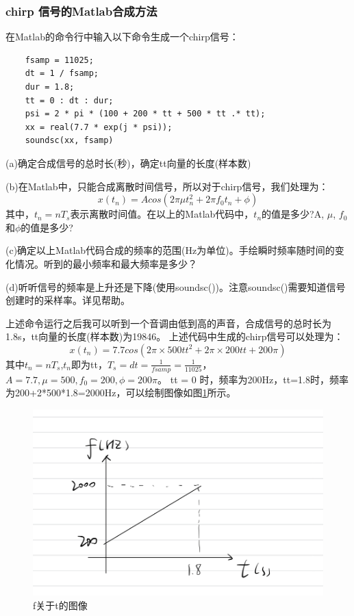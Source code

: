 \documentclass[UTF8]{ctexart}
\begin{document}
\subsubsection{chirp 信号的Matlab合成方法}
在Matlab的命令行中输入以下命令生成一个chirp信号：
\begin{verbatim}
    fsamp = 11025;
    dt = 1 / fsamp;
    dur = 1.8;
    tt = 0 : dt : dur;
    psi = 2 * pi * (100 + 200 * tt + 500 * tt .* tt);
    xx = real(7.7 * exp(j * psi));
    soundsc(xx, fsamp)
\end{verbatim}
\begin{framed}
    (a)确定合成信号的总时长(秒)，确定tt向量的长度(样本数)

    (b)在Matlab中，只能合成离散时间信号，所以对于chirp信号，我们处理为：
    $$x(t_n)=Acos(2\pi \mu t_n^2+2\pi f_0t_n+\phi )$$
    其中，$t_n=nT_s$表示离散时间值。在以上的Matlab代码中，$t_n$的值是多少?A, $\mu$, $f_0$和$\phi$的值是多少?

    (c)确定以上Matlab代码合成的频率的范围(Hz为单位)。手绘瞬时频率随时间的变化情况。听到的最小频率和最大频率是多少？

    (d)听听信号的频率是上升还是下降(使用soundsc())。注意soundsc()需要知道信号创建时的采样率。详见帮助。
\end{framed}
上述命令运行之后我可以听到一个音调由低到高的声音，合成信号的总时长为1.8s，tt向量的长度(样本数)为19846。
上述代码中生成的chirp信号可以处理为：
$$
    x(t_n)=7.7cos(2\pi \times 500tt^2+2\pi \times 200tt + 200\pi)
$$
其中$t_n=nT_s$,$t_n$即为tt，$T_s=dt=\frac{1}{fsamp}=\frac{1}{11025}$，$A=7.7,\mu=500,f_0=200,\phi=200\pi$。
tt = 0 时，频率为200Hz，tt=1.8时，频率为200+2*500*1.8=2000Hz，可以绘制图像如图\ref{img:freq_time}所示。
\begin{figure}[htbp]
    \centering
    \includegraphics[width=0.7\linewidth]{freq_time.png}
    \caption{f关于t的图像}
    \label{img:freq_time}
\end{figure}
\end{document}
